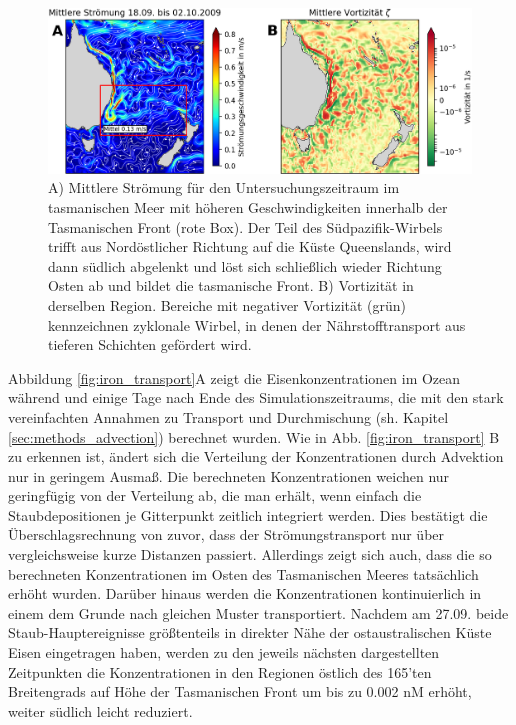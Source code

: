 \documentclass[12pt,a4paper,onecolumn]{scrartcl}
\begin{document}
\begin{figure}
\includegraphics[width=\textwidth]{bilder/currents_mean.png}
\caption{A) Mittlere Strömung für den Untersuchungszeitraum im tasmanischen Meer mit höheren Geschwindigkeiten innerhalb der Tasmanischen Front (rote Box). Der Teil des Südpazifik-Wirbels trifft aus Nordöstlicher Richtung auf die Küste Queenslands, wird dann südlich abgelenkt und löst sich schließlich wieder Richtung Osten ab und bildet die tasmanische Front. B) Vortizität in derselben Region. Bereiche mit negativer Vortizität (grün) kennzeichnen zyklonale Wirbel, in denen der Nährstofftransport aus tieferen Schichten gefördert wird. } \label{fig:tasman_current}
\end{figure}
Abbildung \ref{fig:iron_transport}A zeigt die Eisenkonzentrationen im Ozean während und einige Tage nach Ende des Simulationszeitraums, die mit den stark vereinfachten Annahmen zu Transport und Durchmischung (sh. Kapitel \ref{sec:methods_advection}) berechnet wurden. Wie in Abb. \ref{fig:iron_transport} B zu erkennen ist, ändert sich die Verteilung der Konzentrationen durch Advektion nur in geringem Ausmaß. Die berechneten Konzentrationen weichen nur geringfügig von der Verteilung ab, die man erhält, wenn einfach die Staubdepositionen je Gitterpunkt zeitlich integriert werden. Dies bestätigt die Überschlagsrechnung von zuvor, dass der Strömungstransport nur über vergleichsweise kurze Distanzen passiert. Allerdings zeigt sich auch, dass die so berechneten Konzentrationen im Osten des Tasmanischen Meeres tatsächlich erhöht wurden. Darüber hinaus werden die Konzentrationen kontinuierlich in einem dem Grunde nach gleichen Muster transportiert. Nachdem am 27.09. beide Staub-Hauptereignisse größtenteils in direkter Nähe der ostaustralischen Küste Eisen eingetragen haben, werden zu den jeweils nächsten dargestellten Zeitpunkten die Konzentrationen in den Regionen östlich des 165'ten Breitengrads auf Höhe der Tasmanischen Front um bis zu 0.002 nM erhöht, weiter südlich leicht reduziert. \\
\end{document}

